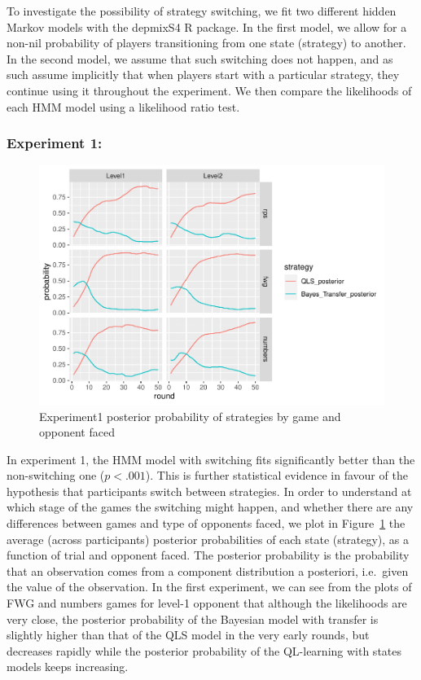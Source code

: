 \documentclass[man,floatsintext]{apa6}
\begin{document}
To investigate the possibility of strategy switching, we fit two different hidden Markov models with the depmixS4 R package. In the first model, we allow for a non-nil probability of players transitioning from one state (strategy) to another. In the second model, we assume that such switching does not happen, and as such assume implicitly that when players start with a particular strategy, they continue using it throughout the experiment. We then compare the likelihoods of each HMM model using a likelihood ratio test.

\hypertarget{experiment-1-1}{%
\subsubsection{Experiment 1:}\label{experiment-1-1}}

\begin{figure}

{\centering \includegraphics{draft_upgrade_v1_files/figure-latex/exp1-posteriors-plot-1} 

}

\caption{Experiment1 posterior probability of strategies by game and opponent faced}\label{fig:exp1-posteriors-plot}
\end{figure}

In experiment 1, the HMM model with switching fits significantly better than the non-switching one (\(p < .001\)). This is further statistical evidence in favour of the hypothesis that participants switch between strategies. In order to understand at which stage of the games the switching might happen, and whether there are any differences between games and type of opponents faced, we plot in Figure~\ref{fig:exp1-posteriors-plot} the average (across participants) posterior probabilities of each state (strategy), as a function of trial and opponent faced. The posterior probability is the probability that an observation comes from a component distribution a posteriori, i.e.~given the value of the observation. In the first experiment, we can see from the plots of FWG and numbers games for level-1 opponent that although the likelihoods are very close, the posterior probability of the Bayesian model with transfer is slightly higher than that of the QLS model in the very early rounds, but decreases rapidly while the posterior probability of the QL-learning with states models keeps increasing.
\end{document}
